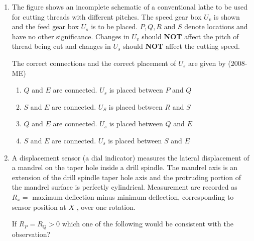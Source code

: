 \documentclass[journal]{IEEEtran}
\begin{document}
\begin{enumerate}
    \item The figure shows an incomplete schematic of a conventional lathe to be used for cutting threads with different pitches. The speed gear box $U_v$
 is shown and the feed gear box $U_s$
 is to be placed. $P, Q, R$
 and $S$
 denote locations and have no other significance. Changes in $U_v$
 should \textbf{NOT}
 affect the pitch of thread being cut and changes in $U_s$
 should \textbf{NOT} affect the cutting speed. 
 
 The correct connections and the correct placement of $U_s$
 are given by \hfill (2008-ME) 
 \begin{enumerate}
         \item $Q$ and $E$ are connected. $U_s$ is placed between $P$ and $Q$
         \item $S$ and $E$ are connected. $U_S$ is placed between $R$ and $S$
         \item $Q$ and $E$ are connected. $U_s$ is placed between $Q$ and $E$
         \item $S$ and $E$ are connected. $U_s$ is placed between $S$ and $E$
 \end{enumerate}
 \item A displacement sensor (a dial indicator) measures the lateral displacement of a mandrel on the taper hole inside a drill spindle. The mandrel axis is an extension of the drill spindle taper hole axis and the protruding portion of the mandrel surface is perfectly cylindrical. Measurement are recorded as $R_x = $
 maximum deflection minus minimum deflection, corresponding to sensor position at $X$
, over one rotation.

If $R_P = R_Q > 0$
 which one of the following would be consistent with the observation? 


\end{enumerate}
\end{document}
